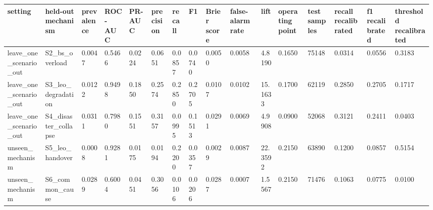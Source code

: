 \begin{tabular}{llllllllllllllll}
\toprule
setting & held-out mechanism & prevalence & ROC-AUC & PR-AUC & precision & recall & F1 & Brier score & false-alarm rate & lift & operating point & test samples & recall recalibrated & f1 recalibrated & threshold recalibrated \\
\midrule
leave\_one\_scenario\_out & S2\_bs\_overload & 0.0047 & 0.5466 & 0.0224 & 0.0651 & 0.0857 & 0.0740 & 0.0050 & 0.0058 & 4.8190 & 0.1650 & 75148 & 0.0314 & 0.0556 & 0.3183 \\
leave\_one\_scenario\_out & S3\_leo\_degradation & 0.0122 & 0.9498 & 0.1850 & 0.2574 & 0.2850 & 0.2705 & 0.0107 & 0.0102 & 15.1633 & 0.1700 & 62119 & 0.2850 & 0.2705 & 0.1717 \\
leave\_one\_scenario\_out & S4\_disaster\_collapse & 0.0311 & 0.7980 & 0.1551 & 0.3157 & 0.0995 & 0.1513 & 0.0291 & 0.0069 & 4.9908 & 0.0900 & 52068 & 0.3121 & 0.2411 & 0.0403 \\
unseen\_mechanism & S5\_leo\_handover & 0.0008 & 0.9281 & 0.0175 & 0.0194 & 0.2200 & 0.0357 & 0.0029 & 0.0087 & 22.3592 & 0.2150 & 63890 & 0.1200 & 0.0857 & 0.5154 \\
unseen\_mechanism & S6\_common\_cause & 0.0289 & 0.6004 & 0.0451 & 0.3056 & 0.0106 & 0.0206 & 0.0287 & 0.0007 & 1.5567 & 0.2150 & 71476 & 0.1063 & 0.0775 & 0.0100 \\
\bottomrule
\end{tabular}
